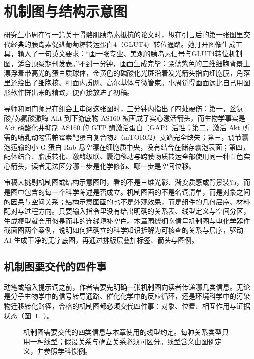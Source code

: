 \chapter{机制图与结构示意图}

研究生小周在写一篇关于骨骼肌胰岛素抵抗的论文时，想在引言后的第一张图里交代经典的胰岛素促进葡萄糖转运蛋白4（GLUT4）转位通路。她打开图像生成工具，输入了一句英文要求：“画一张专业、美观的胰岛素信号与GLUT4转位机制图，适合顶级期刊发表。”不到一分钟，画面生成完毕：深蓝紫色的三维细胞背景上漂浮着带高光的蛋白质球体，金黄色的磷酸化光斑沿着发光箭头指向细胞膜，角落里还绘出了细胞核、粗面内质网、高尔基体与微管束。小周觉得画面远比自己用图形软件拼出来的精致，便直接放进了初稿。

导师和同门师兄在组会上审阅这张图时，三分钟内指出了四处硬伤：第一，丝氨酸/苏氨酸激酶 Akt 到下游底物 AS160 被画成了实心激活箭头，而生物学事实是 Akt 磷酸化并抑制 AS160 的 GTP 酶激活蛋白（GAP）活性；第二，激活 Akt 所需的哺乳动物雷帕霉素靶蛋白复合物2（mTORC2）支路完全缺失；第三，调节囊泡运输的小 G 蛋白 Rab 悬空漂在细胞质中央，没有结合在储存囊泡表面；第四，配体结合、脂质转化、激酶级联、囊泡移动与跨膜物质转运全部使用同一种白色实心箭头，读者无法区分哪一步是化学修饰、哪一步是空间位移。

审稿人挑剔机制图或结构示意图时，看的不是三维光影、渐变质感或背景装饰，而是图中包含的每一个科学陈述是否成立。机制图画的不是名词清单，而是对象之间的因果与空间关系；结构示意图画的也不是外观效果，而是组件的几何层序、材料配对与过程方向。只要输入指令里没有给出明确的关系表、线型定义与空间分区，生成模型就会用似是而非的连线填补空白。本章围绕细胞信号机制图与电化学器件截面图两个案例，说明如何把确立的科学知识拆解为可核查的关系与层序，驱动 AI 生成干净的无字底图，再通过排版层叠加标签、箭头与图例。

\section{机制图要交代的四件事}

动笔或输入提示词之前，作者需要先明确一张机制图向读者传递哪几类信息。无论是分子生物学中的信号转导通路、催化化学中的反应循环，还是环境科学中的污染物迁移转化路径，合格的机制图都必须交代四件事：对象、位置、相互作用与证据状态（图~\ref{fig:ch07-01}）。

\begin{figure}[htbp]\centering

\caption{机制图需要交代的四类信息与本章使用的线型约定。每种关系类型只用一种线型；假设关系与确立关系必须可区分。线型含义由图例定义，并参照学科惯例。}\label{fig:ch07-01}
\end{figure}

